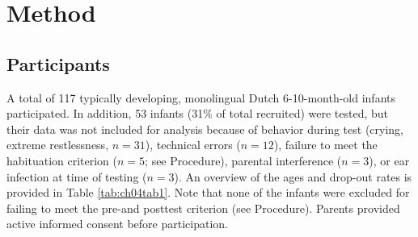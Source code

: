 \documentclass[openright,titlepage,12pt,a4paper]{book}
\begin{document}
\hypertarget{method}{%
\section{Method}\label{method}}

\hypertarget{participants}{%
\subsection{Participants}\label{participants}}

A total of 117 typically developing, monolingual Dutch 6-10-month-old infants participated. In addition, 53 infants (31\% of total recruited) were tested, but their data was not included for analysis because of behavior during test (crying, extreme restlessness, \(n = 31\)), technical errors (\(n = 12\)), failure to meet the habituation criterion (\(n = 5\); see Procedure), parental interference (\(n = 3\)), or ear infection at time of testing (\(n = 3\)). An overview of the ages and drop-out rates is provided in Table \ref{tab:ch04tab1}. Note that none of the infants were excluded for failing to meet the pre-and posttest criterion (see Procedure). Parents provided active informed consent before participation.
\end{document}

